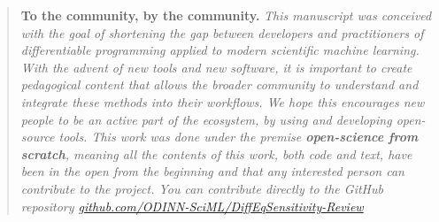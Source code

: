 \begin{quote}
    \textbf{To the community, by the community.}
    \textit{This manuscript was conceived with the goal of shortening the gap between developers and practitioners of differentiable programming applied to  modern scientific machine learning. 
    With the advent of new tools and new software, it is important to create pedagogical content that allows the broader community to understand and integrate these methods into their workflows. 
    We hope this encourages new people to be an active part of the ecosystem, by using and developing open-source tools. 
    This work was done under the premise \textbf{open-science from scratch}, meaning all the contents of this work, both code and text, have been in the open from the beginning and that any interested person can contribute to the project. 
    You can contribute directly to the GitHub repository 
    \url{github.com/ODINN-SciML/DiffEqSensitivity-Review}
    }
\end{quote}